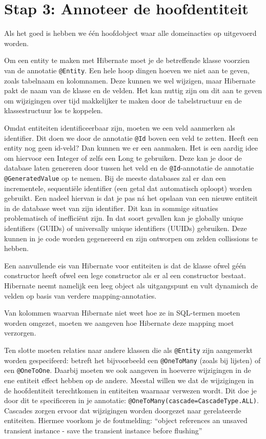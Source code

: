 \documentclass[dutch,a4paper,12pt,doubleside]{book}
\begin{document}
\newpage
\section{Stap 3: Annoteer de hoofdentiteit}
Als het goed is hebben we één hoofdobject waar alle domeinacties
op uitgevoerd worden.

Om een entity te maken met Hibernate moet 
je de betreffende klasse voorzien van de 
annotatie \texttt{@Entity}. Een hele hoop dingen 
hoeven we niet aan te geven, zoals tabelnaam en kolomnamen.
Deze kunnen we wel wijzigen, maar Hibernate pakt de naam 
van de klasse en de velden. Het kan nuttig zijn om dit aan 
te geven om wijzigingen over tijd makkelijker te maken door
de tabelstructuur en de klassestructuur los te koppelen.

Omdat entiteiten
identificeerbaar zijn, moeten we een veld 
aanmerken als identifier. Dit doen we door de annotatie 
\texttt{@Id} boven een veld te zetten. Heeft een entity
nog geen id-veld? Dan kunnen we er een aanmaken. Het is 
een aardig idee om hiervoor een Integer of zelfs een Long 
te gebruiken. Deze kan je door de database laten genereren 
door tussen het veld en de \texttt{@Id}-annotatie 
de annotatie \texttt{@GeneratedValue} op te nemen. 
Bij de meeste databases zal er dan een incrementele, 
sequentiële identifier (een getal dat automatisch oploopt) 
worden gebruikt. Een nadeel hiervan is dat je pas ná het opslaan 
van een nieuwe entiteit in de database weet van zijn identifier. 
Dit kan in sommige situaties problematisch of inefficiënt zijn.
In dat soort gevallen kan je globally unique identifiers (GUIDs)
of universally unique identifiers (UUIDs) gebruiken. Deze kunnen 
in je code worden gegenereerd en zijn ontworpen om zelden collissions
te hebben.

Een aanvullende eis van Hibernate voor entiteiten is
dat de klasse ofwel géén constructor heeft 
ofwel een lege constructor als er al een constructor bestaat. 
Hibernate neemt namelijk een leeg 
object als uitgangspunt en vult dynamisch de velden op basis van 
verdere mapping-annotaties.

Van kolommen waarvan Hibernate niet weet hoe ze in SQL-termen moeten 
worden omgezet, moeten we aangeven hoe Hibernate deze mapping moet 
verzorgen.

Ten slotte moeten relaties naar andere klassen die als
\texttt{@Entity} zijn aangemerkt worden gespecifeerd:
betreft het bijvoorbeeld een \texttt{@OneToMany} (zoals bij lijsten) of een
\texttt{@OneToOne}. Daarbij moeten we ook aangeven in hoeverre 
wijzigingen in de ene entiteit effect hebben op de andere.
Meestal willen we dat de wijzigingen in de hoofdentiteit 
terechtkomen in entiteiten waarnaar verwezen wordt. 
Dit doe je door dit te specificeren in je 
annotatie: \texttt{@OneToMany(cascade=CascadeType.ALL)}. 
Cascades zorgen ervoor dat wijzigingen worden doorgezet 
naar gerelateerde entiteiten. 
Hiermee voorkom je de foutmelding: 
``object references an unsaved transient instance 
- save the transient instance before flushing''
\end{document}
